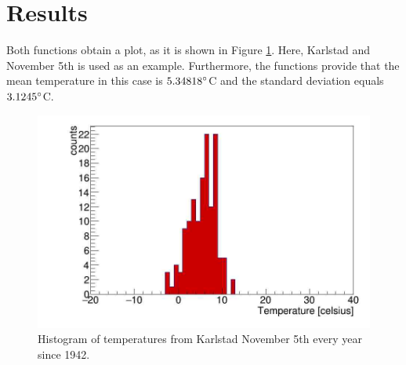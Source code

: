 \documentclass{article}
\begin{document}
\section*{Results}
Both functions obtain a plot, as it is shown in Figure \ref{fig:3.1}. Here, Karlstad and November 5th is used as an example. Furthermore, the functions provide that the mean temperature in this case is $5.34818\degree$C and the standard deviation equals $3.1245\degree$C.
\begin{figure}[H]
    \centering
    \includegraphics[scale = 0.45]{31_twoargs.jpg}
    \caption{Histogram of temperatures from Karlstad November 5th every year since 1942.}
    \label{fig:3.1}
\end{figure}
\end{document}
